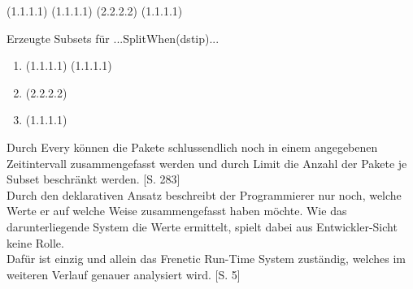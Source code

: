 \documentclass[10pt,conference]{IEEEtran}
\begin{document}
\begin{center}
	(1.1.1.1) (1.1.1.1) (2.2.2.2) (1.1.1.1)
\end{center}
Erzeugte Subsets für ...SplitWhen(dstip)...
\begin{enumerate}
	\item (1.1.1.1) (1.1.1.1)
	\item (2.2.2.2)
	\item (1.1.1.1)
\end{enumerate}
Durch Every können die Pakete schlussendlich noch in einem angegebenen Zeitintervall zusammengefasst werden und durch Limit die Anzahl der Pakete je Subset beschränkt werden. \cite{4}[S. 283]\\
\newline
Durch den deklarativen Ansatz beschreibt der Programmierer nur noch, welche Werte er auf welche Weise zusammengefasst haben möchte. Wie das darunterliegende System die Werte ermittelt, spielt dabei aus Entwickler-Sicht keine Rolle.\\ 
Dafür ist einzig und allein das Frenetic Run-Time System zuständig, welches im weiteren Verlauf genauer analysiert wird. \cite{3}[S. 5]
\end{document}
